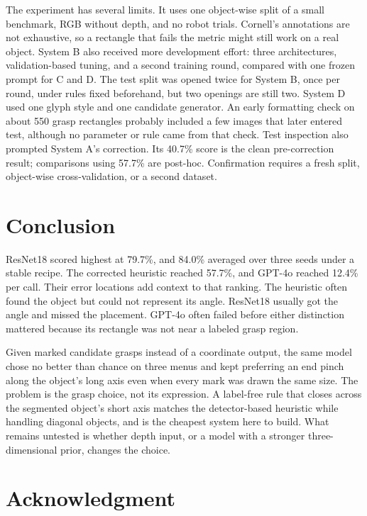\documentclass[10pt,conference]{IEEEtran}
\begin{document}
The experiment has several limits. It uses one object-wise split of a small
benchmark, RGB without depth, and no robot trials. Cornell's annotations are
not exhaustive, so a rectangle that fails the metric might still work on a
real object. System B also received more development effort: three
architectures, validation-based tuning, and a second training round,
compared with one frozen prompt for C and D. The test split was opened
twice for System B, once per round, under rules fixed beforehand, but two
openings are still two. System D used one glyph style and one candidate
generator. An early formatting check on about 550 grasp rectangles probably
included a few images that later entered test, although no parameter or rule
came from that check. Test inspection also prompted System A's correction.
Its 40.7\% score is the clean pre-correction result; comparisons
using 57.7\% are post-hoc. Confirmation requires a fresh split, object-wise
cross-validation, or a second dataset.

\section{Conclusion}

ResNet18 scored highest at 79.7\%, and 84.0\% averaged over three seeds
under a stable recipe. The corrected heuristic reached 57.7\%, and GPT-4o
reached 12.4\% per call. Their error locations add context to that
ranking. The heuristic often found the object but could not represent
its angle. ResNet18 usually got the angle and missed the placement. GPT-4o
often failed before either distinction mattered because its rectangle was not
near a labeled grasp region.

Given marked candidate grasps instead of a coordinate output, the same model
chose no better than chance on three menus and kept preferring an end pinch
along the object's long axis even when every mark was drawn the same size.
The problem is the grasp choice, not its expression. A label-free rule that
closes across the segmented object's short axis matches the detector-based
heuristic while handling diagonal objects, and is the cheapest system here
to build. What remains untested is whether depth input, or a model with a
stronger three-dimensional prior, changes the choice.

\section*{Acknowledgment}
\end{document}
